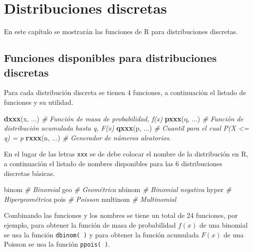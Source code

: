 \documentclass[10pt,]{krantz}
\makeatletter
\newenvironment{Shaded}{\begin{snugshade}}{\end{snugshade}}
\newcommand{\KeywordTok}[1]{\textcolor[rgb]{0.13,0.29,0.53}{\textbf{#1}}}
\newcommand{\CommentTok}[1]{\textcolor[rgb]{0.56,0.35,0.01}{\textit{#1}}}
\newcommand{\NormalTok}[1]{#1}
\newenvironment{kframe}{%
\medskip{}
\setlength{\fboxsep}{.8em}
 \def\at@end@of@kframe{}%
 \ifinner\ifhmode%
  \def\at@end@of@kframe{\end{minipage}}%
  \begin{minipage}{\columnwidth}%
 \fi\fi%
 \def\FrameCommand##1{\hskip\@totalleftmargin \hskip-\fboxsep
 \colorbox{shadecolor}{##1}\hskip-\fboxsep
     \hskip-\linewidth \hskip-\@totalleftmargin \hskip\columnwidth}%
 \MakeFramed {\advance\hsize-\width
   \@totalleftmargin\z@ \linewidth\hsize
   \@setminipage}}%
 {\par\unskip\endMakeFramed%
 \at@end@of@kframe}
\renewenvironment{Shaded}{\begin{kframe}}{\end{kframe}}
\makeatother
\begin{document}
\chapter{Distribuciones discretas}\label{discretas}

En este capítulo se mostrarán las funciones de R para distribuciones
discretas.

\section{\texorpdfstring{Funciones disponibles para distribuciones
discretas
}{Funciones disponibles para distribuciones discretas }}\label{funciones-disponibles-para-distribuciones-discretas}

Para cada distribución discreta se tienen 4 funciones, a continuación el
listado de funciones y su utilidad.

\begin{Shaded}
\begin{Highlighting}[]
\KeywordTok{dxxx}\NormalTok{(x, ...)  }\CommentTok{# Función de masa de probabilidad, f(x)}
\KeywordTok{pxxx}\NormalTok{(q, ...)  }\CommentTok{# Función de distribución acumulada hasta q, F(x)}
\KeywordTok{qxxx}\NormalTok{(p, ...)  }\CommentTok{# Cuantil para el cual P(X <= q) = p}
\KeywordTok{rxxx}\NormalTok{(n, ...)  }\CommentTok{# Generador de números aleatorios.}
\end{Highlighting}
\end{Shaded}

En el lugar de las letras \texttt{xxx} se de debe colocar el nombre de
la distribución en R, a continuación el listado de nombres disponibles
para las 6 distribuciones discretas básicas.

\begin{Shaded}
\begin{Highlighting}[]
\NormalTok{binom     }\CommentTok{# Binomial}
\NormalTok{geo       }\CommentTok{# Geométrica}
\NormalTok{nbinom    }\CommentTok{# Binomial negativa}
\NormalTok{hyper     }\CommentTok{# Hipergeométrica}
\NormalTok{pois      }\CommentTok{# Poisson}
\NormalTok{multinom  }\CommentTok{# Multinomial}
\end{Highlighting}
\end{Shaded}

Combinando las funciones y los nombres se tiene un total de 24
funciones, por ejemplo, para obtener la función de masa de probabilidad
\(f(x)\) de una binomial se usa la función \texttt{dbinom(\ )} y para
obtener la función acumulada \(F(x)\) de una Poisson se usa la función
\texttt{ppois(\ )}.
\end{document}
